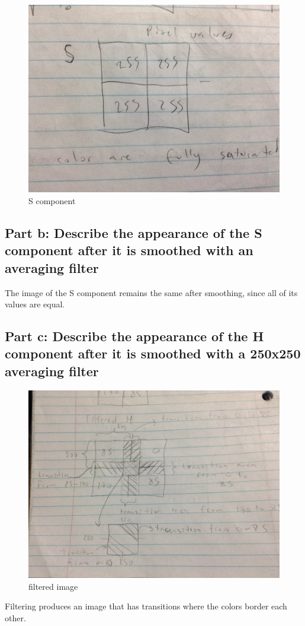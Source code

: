 \documentclass{article}
\begin{document}
	\begin{figure}[H]
		\includegraphics[width=\linewidth]{6.25/fig3.JPG}
		\caption{S component}
	\end{figure}
	
	\subsection{Part b: Describe the appearance of the S component after it is smoothed with an averaging filter}
	The image of the S component remains the same after smoothing, since all of its values are equal.
	\subsection{Part c: Describe the appearance of the H component after it is smoothed with a 250x250 averaging filter}
	\begin{figure}[H]
		\includegraphics[width=\linewidth]{6.25/fig5.JPG}
		\caption{filtered image}
	\end{figure}
	Filtering produces an image that has transitions where the colors border each other.
	
\end{document}

